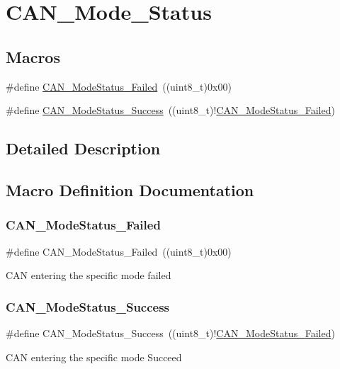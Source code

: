 \hypertarget{group___c_a_n___mode___status}{}\section{C\+A\+N\+\_\+\+Mode\+\_\+\+Status}
\label{group___c_a_n___mode___status}
\subsection*{Macros}
\begin{DoxyCompactItemize}
\item 
\#define \mbox{\hyperlink{group___c_a_n___mode___status_ga9882944537945325ef08e1986838ea45}{C\+A\+N\+\_\+\+Mode\+Status\+\_\+\+Failed}}~((uint8\+\_\+t)0x00)
\item 
\#define \mbox{\hyperlink{group___c_a_n___mode___status_ga7ca0ea503eb3b3a7c0abdfad27cb6579}{C\+A\+N\+\_\+\+Mode\+Status\+\_\+\+Success}}~((uint8\+\_\+t)!\mbox{\hyperlink{group___c_a_n___mode___status_ga9882944537945325ef08e1986838ea45}{C\+A\+N\+\_\+\+Mode\+Status\+\_\+\+Failed}})
\end{DoxyCompactItemize}


\subsection{Detailed Description}


\subsection{Macro Definition Documentation}
\mbox{\label{group___c_a_n___mode___status_ga9882944537945325ef08e1986838ea45}} 
\subsubsection{\texorpdfstring{CAN\_ModeStatus\_Failed}{CAN\_ModeStatus\_Failed}}
{\footnotesize\ttfamily \#define C\+A\+N\+\_\+\+Mode\+Status\+\_\+\+Failed~((uint8\+\_\+t)0x00)}

C\+AN entering the specific mode failed \mbox{\label{group___c_a_n___mode___status_ga7ca0ea503eb3b3a7c0abdfad27cb6579}} 
\subsubsection{\texorpdfstring{CAN\_ModeStatus\_Success}{CAN\_ModeStatus\_Success}}
{\footnotesize\ttfamily \#define C\+A\+N\+\_\+\+Mode\+Status\+\_\+\+Success~((uint8\+\_\+t)!\mbox{\hyperlink{group___c_a_n___mode___status_ga9882944537945325ef08e1986838ea45}{C\+A\+N\+\_\+\+Mode\+Status\+\_\+\+Failed}})}

C\+AN entering the specific mode Succeed 